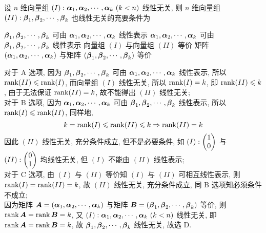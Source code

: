 \begin{example}
    设 $n$ 维向量组 $(I):\vb*{\alpha}_1,\vb*{\alpha}_2,\cdots,\vb*{\alpha}_k~ (k<n)$ 线性无关, 则 $n$ 维向量组 $(II):\vb*{\beta}_1,\vb*{\beta}_2,\cdots,\vb*{\beta}_k$ 也线性无关的充要条件为
    \begin{tasks}
        \task $\vb*{\beta}_1,\vb*{\beta}_2,\cdots,\vb*{\beta}_k$ 可由 $\vb*{\alpha}_1,\vb*{\alpha}_2,\cdots,\vb*{\alpha}_k$ 线性表示
        \task $\vb*{\alpha}_1,\vb*{\alpha}_2,\cdots,\vb*{\alpha}_k$ 可由 $\vb*{\beta}_1,\vb*{\beta}_2,\cdots,\vb*{\beta}_k$ 线性表示
        \task 向量组 $(I)$ 与向量组 $(II)$ 等价
        \task 矩阵 $(\vb*{\alpha}_1,\vb*{\alpha}_2,\cdots,\vb*{\alpha}_k)$ 与矩阵 $(\vb*{\beta}_1,\vb*{\beta}_2,\cdots,\vb*{\beta}_k)$ 等价
    \end{tasks}
\end{example}
\begin{solution}
    对于 A 选项, 因为 $\vb*{\beta}_1,\vb*{\beta}_2,\cdots,\vb*{\beta}_k$ 可由 $\vb*{\alpha}_1,\vb*{\alpha}_2,\cdots,\vb*{\alpha}_k$ 线性表示, 所以 $\rank(II)\leqslant \rank(I)$, 而向量组 $(I)$ 线性无关,
    所以 $\rank(I)=k$, 即 $\rank(II)\leqslant k$, 由于无法保证 $\rank(II)=k$, 故不能得出 $(II)$ 线性无关;\\
    对于 B 选项, 因为 $\vb*{\alpha}_1,\vb*{\alpha}_2,\cdots,\vb*{\alpha}_k$ 可由 $\vb*{\beta}_1,\vb*{\beta}_2,\cdots,\vb*{\beta}_k$ 线性表示, 所以 $\rank(I)\leqslant \rank(II)$, 同样地,
    $$k=\rank(I)\leqslant\rank(II)\leqslant k\Rightarrow \rank(II)=k$$
    因此 $(II)$ 线性无关, 充分条件成立, 但不是必要条件, 如 $(I):\mqty(1\\0)$ 与 $(II):\mqty(0\\1)$ 均线性无关, 但 $(I)$ 不能由 $(II)$ 线性表示;\\
    对于 C 选项, 由 $(I)$ 与 $(II)$ 等价知 $(I)$ 与 $(II)$ 可相互线性表示, 则 $\rank(I)=\rank(II)=k$, 故 $(II)$ 线性无关, 充分条件成立, 同 B 选项知必须条件不成立;\\
    因为矩阵 $\vb*{A}=(\vb*{\alpha}_1,\vb*{\alpha}_2,\cdots,\vb*{\alpha}_k)$ 与矩阵 $\vb*{B}=(\vb*{\beta}_1,\vb*{\beta}_2,\cdots,\vb*{\beta}_k)$ 等价, 则 $\rank\vb*{A}=\rank\vb*{B}=k$,
    又 $(I):\vb*{\alpha}_1,\vb*{\alpha}_2,\cdots,\vb*{\alpha}_k~ (k<n)$ 线性无关, 即 $\rank\vb*{A}=\rank\vb*{B}=k$, 故 $\vb*{\beta}_1,\vb*{\beta}_2,\cdots,\vb*{\beta}_k$ 线性无关, 故选 D.
\end{solution}

